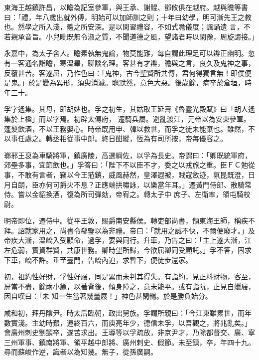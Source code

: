 \begin{pinyinscope}
 東海王越鎮許昌，以瞻為記室參軍，與王承、謝鯤、鄧攸俱在越府。越與瞻等書曰：「禮，年八歲出就外傅，明始可以加師訓之則；十年曰幼學，明可漸先王之教也。然學之所入淺，體之所安深。是以閑習禮容，不如式瞻儀度；諷誦遺
 言，不若親承音旨。小兒毗既無令淑之質，不聞道德之風，望諸君時以閑豫，周旋誨接。」



 永嘉中，為太子舍人。瞻素執無鬼論，物莫能難，每自謂此理足可以辯正幽明。忽有一客通名詣瞻，寒溫畢，聊談名理。客甚有才辯，瞻與之言，良久及鬼神之事，反覆甚苦。客遂屈，乃作色曰：「鬼神，古今聖賢所共傳，君何得獨言無！即僕便是鬼。」於是變為異形，須臾消滅。瞻默然，意色大惡。後歲餘，病卒於倉垣，時年三十。



 孚字遙集。其母，即胡婢也。孚之初生，其姑取王延壽《魯靈光殿賦》曰「胡人遙集於上楹」而以字焉。初辟太傅府，
 遷騎兵屬。避亂渡江，元帝以為安東參軍。蓬髮飲酒，不以王務嬰心。時帝既用申、韓以救世，而孚之徒未能棄也。雖然，不以事任處之。轉丞相從事中郎。終日酣縱，恆為有司所按，帝每優容之。



 瑯邪王裒為車騎將軍，鎮廣陵，高選綱佐，以孚為長史。帝謂曰：「卿既統軍府，郊壘多事，宜節飲也。」孚答曰：「陛下不以臣不才，委之以戎旅之重。臣ＦＣ勉從事，不敢有言者，竊以今王蒞鎮，威風赫然，皇澤遐被，賊寇斂迹，氛昆既澄，日月自朗，臣亦何可爵火不息？正應端拱嘯詠，以樂當年耳。」遷黃門侍郎、散騎常侍。嘗以金貂換酒，復為所司彈劾，帝宥之。轉太子中
 庶子、左衛率，領屯騎校尉。



 明帝即位，遷侍中。從平王敦，賜爵南安縣侯。轉吏部尚書，領東海王師，稱疾不拜。詔就家用之，尚書令郗鑒以為非禮。帝曰：「就用之誠不快，不爾便廢才。」及帝疾大漸，溫嶠入受顧命，過孚，要與同行。升車，乃告之曰：「主上遂大漸，江左危弱，實資群賢，共康世務。卿時望所歸，今欲屈卿同受顧託。」孚不答，固求下車，嶠不許。垂至臺門，告嶠內迫，求暫下，便徒步還家。



 初，祖約性好財，孚性好屐，同是累而未判其得失。有詣約，見正料財物，客至，屏當不盡，餘兩小簏，以著背後，傾身障之，意未能平。或有詣阮，正見自蠟屐，因自嘆曰：「未
 知一生當著幾量屐！」神色甚閑暢。於是勝負始分。



 咸和初，拜丹陰尹。時太后臨朝，政出舅族。孚謂所親曰：「今江東雖累世，而年數實淺。主幼時艱，運終百六，而庾亮年少，德信未孚，以吾觀之，將兆亂矣。」會廣州刺史劉顗卒，遂苦求出。王導等以孚疏放，非京尹才，乃除都督交、廣、寧三州軍事、鎮南將軍、領平越中郎將、廣州刺史、假節。未至鎮，卒，年四十九。尋而蘇峻作逆，識者以為知幾。無子，從孫廣嗣。




\end{pinyinscope}

